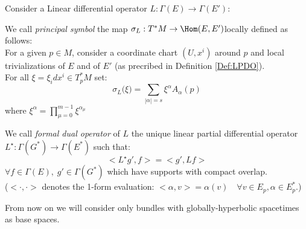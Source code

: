 \documentclass[Main]{subfiles}
\begin{document}
			Consider a Linear differential operator $L: \Gamma(E) \rightarrow \Gamma(E')$:
			\begin{definition}
			 	We call \emph{principal symbol} the map $\sigma_L: T^*M \rightarrow \Hom(E,E') $locally defined as follows: \\
			 	For a given $p\in M$, consider a coordinate chart $(U, x^i)$ around $p$ and local trivializations of $E$ and of $E'$ (as precribed in Definition \ref{Def:LPDO}).
			 	\\ 
			 	For all $\xi = \xi_i dx^i \in T^*_pM$ set:
			 	\begin{displaymath}
			 		\sigma_L \big(\xi \big) = \sum_{|\alpha|=s}  \xi^\alpha A_\alpha (p) 
			 	\end{displaymath}
			 	where $ \xi^\alpha = \prod_{\mu=0}^{m-1} \xi^{\alpha_\mu}$
			 \end{definition}
			\begin{definition}
				We call \emph{formal dual operator} of $L$
				the unique linear partial differential operator $L^\star: \Gamma(G^*) \rightarrow \Gamma(E^*)$ such that:
				\begin{displaymath}
					<L^\star g' , f > = <g', L f> 
				\end{displaymath}
				$\forall f\in \Gamma(E),\; g' \in \Gamma(G^*)$ which have supports with compact overlap.
				\\
				($<\cdot,\cdot>$ denotes the 1-form evaluation: $<\alpha,v>= \alpha(v) \quad \forall v\in E_p, \alpha \in E^*_p$.)
			\end{definition}
			\begin{NB}
			
				From now on we will consider only bundles with globally-hyperbolic spacetimes as base spaces.
			\end{NB}			
		
\end{document}
